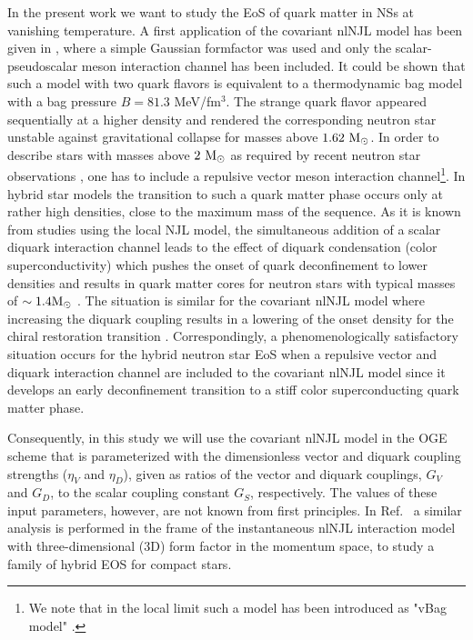 \documentclass[%
 reprint,
superscriptaddress,
nofootinbib,
 amsmath,amssymb,
 aps,
]{revtex4-1}
\begin{document}
In the present work we want to study the EoS of quark matter in NSs
at vanishing temperature. 
A first application of the covariant nlNJL model has been given in 
\cite{Gocke:2001ri}, where a simple Gaussian formfactor was used and only the scalar-pseudoscalar meson interaction channel has been included. It could be shown that such a model with two quark flavors is equivalent to a thermodynamic bag model with a  bag pressure $B=81.3$ MeV/fm$^3$. The strange quark flavor appeared sequentially at a higher density and rendered the corresponding neutron star unstable against gravitational collapse for masses 
above $1.62~\textmd{M}_\odot$.  
In order to describe stars with masses above $2~\textmd{M}_\odot$ as required by recent neutron star observations \cite{fonseca2021refined}, one has to include a repulsive vector meson interaction channel\footnote{We note that in the local limit such a model has been introduced as "vBag model" \cite{Klahn:2015mfa}.}.
In hybrid star models the transition to such a quark matter phase
occurs only at rather high densities, close to the maximum mass of the sequence. 
As it is known from studies using the local NJL model, the simultaneous addition of a scalar diquark interaction channel leads to the effect of diquark condensation (color superconductivity) which pushes the onset of quark deconfinement to lower densities and results in quark matter cores for neutron stars with typical masses of $\sim 1.4 \textmd{M}_\odot$ \cite{Klahn:2006iw,Klahn:2013kga}.
The situation is similar for the covariant nlNJL model where increasing the diquark coupling results in a lowering of the onset density for the chiral restoration transition \cite{GomezDumm:2005hy}. 
Correspondingly, a phenomenologically satisfactory situation occurs for the hybrid neutron star EoS when a repulsive vector and diquark interaction channel are included to the covariant nlNJL model \cite{Blaschke:2007ri} since it develops an early deconfinement transition to a stiff color superconducting quark matter phase.

Consequently, in this study we will use the covariant nlNJL model in the OGE scheme that is parameterized with the dimensionless vector and diquark coupling strengths ($\eta_V$ and $\eta_D$), given as ratios of the vector and diquark couplings, $G_V$ and $G_D$, to the scalar coupling constant $G_S$, respectively. The values of these input parameters, however, are not known from first principles. 
{In Ref.~ \cite{Contrera:2022tqh} a similar analysis is performed in the frame of the instantaneous nlNJL interaction model with three-dimensional (3D) form factor in the momentum space, to study a family of hybrid EOS for compact stars.}
\end{document}
